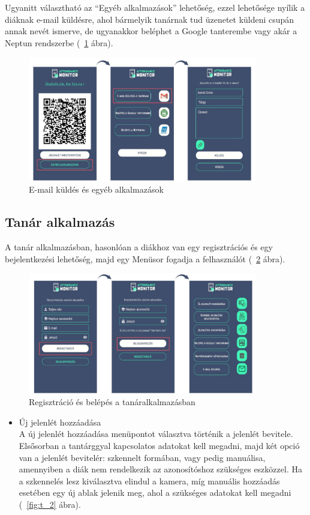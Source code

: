 \documentclass[12pt]{article}
\numberwithin{figure}{section}
\numberwithin{equation}{section}
\begin{document}
\hfill \break
Ugyanitt választható az \enquote{Egyéb alkalmazások} lehetőség, ezzel lehetősége nyílik a diáknak e-mail küldésre, ahol bármelyik tanárnak tud üzenetet küldeni csupán annak nevét ismerve, de ugyanakkor beléphet a Google tanterembe vagy akár a Neptun rendszerbe (~\ref{fig:s_3} ábra).

\begin{figure}[H]
	\centering
	\includegraphics[width=380px]{s_3.jpg}
	\caption{E-mail küldés és egyéb alkalmazások}
	\label{fig:s_3}
\end{figure}

\hfill \break


\subsection{Tanár alkalmazás}
	A tanár alkalmazásban, hasonlóan a diákhoz van egy regisztrációs és egy bejelentkezési lehetőség, majd egy Menüsor fogadja a felhasználót (~\ref{fig:t_1} ábra).\\

\begin{figure}[H]
	\centering
	\includegraphics[width=380px]{t_1.jpg}
	\caption{Regisztráció és belépés a tanáralkalmazásban}
	\label{fig:t_1}
\end{figure}

\begin{itemize}
	\item {Új jelenlét hozzáadása}\\
	A új jelenlét hozzáadása menüpontot választva történik a jelenlét bevitele. Elsősorban a tantárggyal kapcsolatos adatokat kell megadni, majd két opció van a jelenlét bevitelér: szkennelt formában, vagy pedig manuálisa, amennyiben a diák nem rendelkezik az azonosítóshoz szükséges eszközzel. Ha a szkennelés lesz kiválasztva elindul a kamera, míg manuális hozzáadás esetében egy új ablak jelenik meg, ahol a szükséges adatokat kell megadni (~\ref{fig:t_2} ábra).
\end{itemize}
\end{document}
